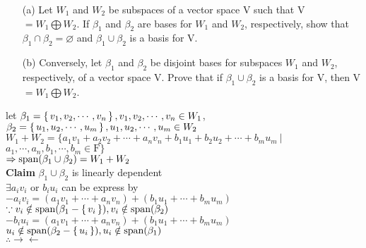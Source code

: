 \begin{enumerate}
	\item[(a)] Let $W_1$ and $W_2$ be subspaces of a vector space V such that V $= W_1 \bigoplus W_2$. If $\beta_{1}$ and $\beta_{2}$ are bases for $W_1$ and $W_2$, respectively, show that $\beta_1 \cap \beta_2 = \varnothing$ and $\beta_1 \cup \beta_2$ is a basis for V.
	\item[(b)] Conversely, let $\beta_1$ and $\beta_2$ be disjoint bases for subspaces $W_1$ and $W_2$, respectively, of a vector space V. Prove that if $\beta_1 \cup \beta_2$ is a basis for V, then V $= W_1 \bigoplus W_2$.
\end{enumerate}

\begin{tcolorbox}
	\begin{solution}
		let $\beta_1 = \left\{ \,v_1,v_2,\cdots,v_n \,\right\},v_1,v_2,\cdots,v_n \in W_1$,\\ $\beta_2 = \left\{ \,u_1,u_2,\cdots,u_m \,\right\},u_1,u_2,\cdots,u_m \in W_2$\\
		$W_1 + W_2 = \{a_1v_1+a_2v_2+\cdots+a_nv_n+b_1u_1+b_2u_2+\cdots+b_mu_m ~|~  $ \\$a_1,\cdots,a_n,b_1,\cdots,b_m \in \mathrm{F}\} $\\
		$\Rightarrow \text{span($\beta_1 \cup \beta_2$)} = W_1 + W_2$\\
		\textbf{Claim} ${\beta_1 \cup \beta_2}$ is linearly dependent\\
		$\exists a_iv_i$ or $b_iu_i$ can be express by\\
		$-a_iv_i = (a_1v_1+\cdots+a_nv_n)+(b_1u_1+\cdots+b_mu_m)$ \\
		$\because v_i \notin \text{span($\beta_1-\left\{ \,v_i \,\right\}$)}, v_i \notin \text{span($\beta_2$)}$\\
		$-b_iu_i = (a_1v_1+\cdots+a_nv_n)+(b_1u_1+\cdots+b_mu_m)$ \\
		$u_i \notin \text{span($\beta_2-\left\{ \,u_i \,\right\}$)}, u_i \notin \text{span($\beta_1$)}$\\
		$\therefore \rightarrow\leftarrow$
		
	\end{solution}
\end{tcolorbox}